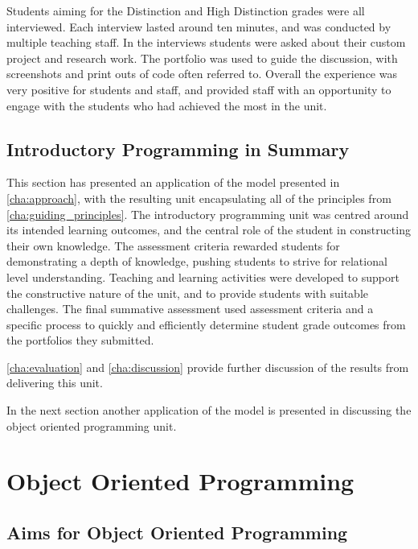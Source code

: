 Students aiming for the Distinction and High Distinction grades were all interviewed. Each interview lasted around ten minutes, and was conducted by multiple teaching staff. In the interviews students were asked about their custom project and research work. The portfolio was used to guide the discussion, with screenshots and print outs of code often referred to. Overall the experience was very positive for students and staff, and provided staff with an opportunity to engage with the students who had achieved the most in the unit.


\subsection{Introductory Programming in Summary} %
\label{sub:intro_summary}

This section has presented an application of the model presented in \cref{cha:approach}, with the resulting unit encapsulating all of the principles from \cref{cha:guiding_principles}. The introductory programming unit was centred around its intended learning outcomes, and the central role of the student in constructing their own knowledge. The assessment criteria rewarded students for demonstrating a depth of knowledge, pushing students to strive for relational level understanding. Teaching and learning activities were developed to support the constructive nature of the unit, and to provide students with suitable challenges. The final summative assessment used assessment criteria and a specific process to quickly and efficiently determine student grade outcomes from the portfolios they submitted. 

\cref{cha:evaluation} and \cref{cha:discussion} provide further discussion of the results from delivering this unit.

In the next section another application of the model is presented in discussing the object oriented programming unit.


\clearpage
\section{Object Oriented Programming} %
\label{sec:object_oriented_programming}

\subsection{Aims for Object Oriented Programming} %
\label{sub:aims_for_object_oriented_programming}

